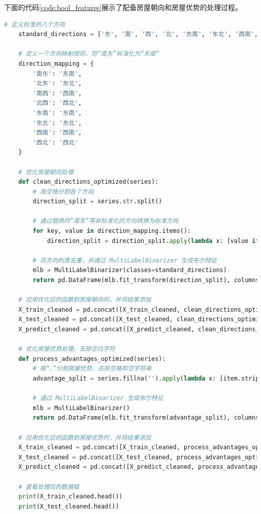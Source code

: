\documentclass[
    report,     %
    oneside,    %
    UTF8,       %
    zihao=-4    %
]{config} %
\begin{document}
下面的代码\ref{code:bool_features}展示了配备房屋朝向和房屋优势的处理过程。
\begin{lstlisting}[label=code:bool_features, language=Python, caption=房屋朝向和房屋优势的处理代码]
    # 定义标准的八个方向
    standard_directions = ['东', '南', '西', '北', '东南', '东北', '西南', '西北']
    
    # 定义一个方向映射规则，将“南东”标准化为“东南”
    direction_mapping = {
        '南东': '东南',
        '北东': '东北',
        '南西': '西南',
        '北西': '西北',
        '东南': '东南',
        '东北': '东北',
        '西南': '西南',
        '西北': '西北'
    }
    
    # 优化房屋朝向处理
    def clean_directions_optimized(series):
        # 用空格分割各个方向
        direction_split = series.str.split()
        
        # 通过替换将“南东”等非标准化的方向转换为标准方向
        for key, value in direction_mapping.items():
            direction_split = direction_split.apply(lambda x: [value if d == key else d for d in x])
        
        # 将方向列表去重，并通过 MultiLabelBinarizer 生成布尔特征
        mlb = MultiLabelBinarizer(classes=standard_directions)
        return pd.DataFrame(mlb.fit_transform(direction_split), columns=mlb.classes_, index=series.index)
    
    # 应用优化后的函数到房屋朝向列，并将结果添加
    X_train_cleaned = pd.concat([X_train_cleaned, clean_directions_optimized(X_train['房屋朝向'])], axis=1)
    X_test_cleaned = pd.concat([X_test_cleaned, clean_directions_optimized(X_test['房屋朝向'])], axis=1)
    X_predict_cleaned = pd.concat([X_predict_cleaned, clean_directions_optimized(X_predict['房屋朝向'])], axis=1)
    
    # 优化房屋优势处理，去除空白字符
    def process_advantages_optimized(series):
        # 按“、”分割房屋优势，去除空格和空字符串
        advantage_split = series.fillna('').apply(lambda x: [item.strip() for item in x.split('、') if item.strip()])
        
        # 通过 MultiLabelBinarizer 生成布尔特征
        mlb = MultiLabelBinarizer()
        return pd.DataFrame(mlb.fit_transform(advantage_split), columns=mlb.classes_, index=series.index)
    
    # 应用优化后的函数到房屋优势列，并将结果添加
    X_train_cleaned = pd.concat([X_train_cleaned, process_advantages_optimized(X_train['房屋优势'])], axis=1)
    X_test_cleaned = pd.concat([X_test_cleaned, process_advantages_optimized(X_test['房屋优势'])], axis=1)
    X_predict_cleaned = pd.concat([X_predict_cleaned, process_advantages_optimized(X_predict['房屋优势'])], axis=1)
    
    # 查看处理后的数据框
    print(X_train_cleaned.head())
    print(X_test_cleaned.head())
\end{lstlisting}
\end{document}
